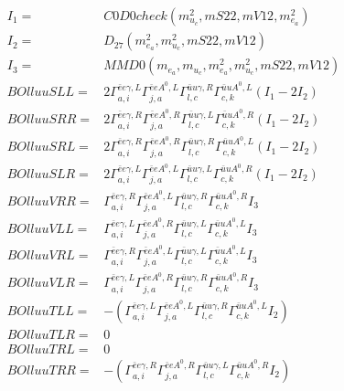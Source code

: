 \documentclass[A4,landscape]{article}
\begin{document}
\begin{align} 
I_1 = & C0D0check(m^2_{u_{{c}}}, mS22, mV12, m^2_{e_{{a}}}) \\ 
I_2 = & D_{27}(m^2_{e_{{a}}}, m^2_{u_{{c}}}, mS22, mV12) \\ 
I_3 = & MMD0(m_{e_{{a}}}, m_{u_{{c}}}, m^2_{e_{{a}}}, m^2_{u_{{c}}}, mS22, mV12) \\ 
  BOlluuSLL= & 2  \Gamma^{\bar{e}e \gamma ,L}_{a, i} \Gamma^{\bar{e}e A^0 ,L}_{j, a} \Gamma^{\bar{u}u \gamma ,R}_{l, c} \Gamma^{\bar{u}u A^0 ,L}_{c, k} (I_1 - 2 I_2) \\ 
  BOlluuSRR= & 2  \Gamma^{\bar{e}e \gamma ,R}_{a, i} \Gamma^{\bar{e}e A^0 ,R}_{j, a} \Gamma^{\bar{u}u \gamma ,L}_{l, c} \Gamma^{\bar{u}u A^0 ,R}_{c, k} (I_1 - 2 I_2) \\ 
  BOlluuSRL= & 2  \Gamma^{\bar{e}e \gamma ,R}_{a, i} \Gamma^{\bar{e}e A^0 ,R}_{j, a} \Gamma^{\bar{u}u \gamma ,R}_{l, c} \Gamma^{\bar{u}u A^0 ,L}_{c, k} (I_1 - 2 I_2) \\ 
  BOlluuSLR= & 2  \Gamma^{\bar{e}e \gamma ,L}_{a, i} \Gamma^{\bar{e}e A^0 ,L}_{j, a} \Gamma^{\bar{u}u \gamma ,L}_{l, c} \Gamma^{\bar{u}u A^0 ,R}_{c, k} (I_1 - 2 I_2) \\ 
  BOlluuVRR= &  \Gamma^{\bar{e}e \gamma ,R}_{a, i} \Gamma^{\bar{e}e A^0 ,L}_{j, a} \Gamma^{\bar{u}u \gamma ,R}_{l, c} \Gamma^{\bar{u}u A^0 ,R}_{c, k} I_3 \\ 
  BOlluuVLL= &  \Gamma^{\bar{e}e \gamma ,L}_{a, i} \Gamma^{\bar{e}e A^0 ,R}_{j, a} \Gamma^{\bar{u}u \gamma ,L}_{l, c} \Gamma^{\bar{u}u A^0 ,L}_{c, k} I_3 \\ 
  BOlluuVRL= &  \Gamma^{\bar{e}e \gamma ,R}_{a, i} \Gamma^{\bar{e}e A^0 ,L}_{j, a} \Gamma^{\bar{u}u \gamma ,L}_{l, c} \Gamma^{\bar{u}u A^0 ,L}_{c, k} I_3 \\ 
  BOlluuVLR= &  \Gamma^{\bar{e}e \gamma ,L}_{a, i} \Gamma^{\bar{e}e A^0 ,R}_{j, a} \Gamma^{\bar{u}u \gamma ,R}_{l, c} \Gamma^{\bar{u}u A^0 ,R}_{c, k} I_3 \\ 
  BOlluuTLL= & -( \Gamma^{\bar{e}e \gamma ,L}_{a, i} \Gamma^{\bar{e}e A^0 ,L}_{j, a} \Gamma^{\bar{u}u \gamma ,R}_{l, c} \Gamma^{\bar{u}u A^0 ,L}_{c, k} I_2) \\ 
  BOlluuTLR= & 0 \\ 
  BOlluuTRL= & 0 \\ 
  BOlluuTRR= & -( \Gamma^{\bar{e}e \gamma ,R}_{a, i} \Gamma^{\bar{e}e A^0 ,R}_{j, a} \Gamma^{\bar{u}u \gamma ,L}_{l, c} \Gamma^{\bar{u}u A^0 ,R}_{c, k} I_2) \\ 
\end{align} 
\end{document}
